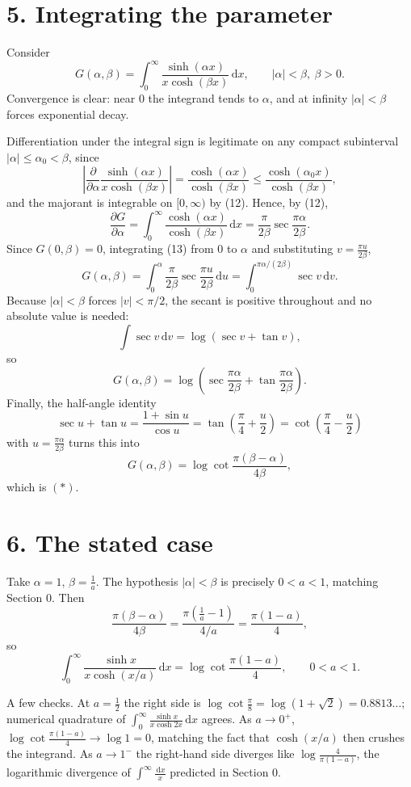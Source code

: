 \documentclass[12pt]{article}
\newcommand{\dd}{\,\mathrm{d}}
\begin{document}
\section*{5. Integrating the parameter}

Consider
\[
G(\alpha,\beta)=\int_0^\infty\frac{\sinh(\alpha x)}{x\cosh(\beta x)}\dd x,
\qquad |\alpha|<\beta,\ \beta>0 .
\]
Convergence is clear: near \(0\) the integrand tends to \(\alpha\), and at
infinity \(|\alpha|<\beta\) forces exponential decay.

Differentiation under the integral sign is legitimate on any compact
subinterval \(|\alpha|\le\alpha_0<\beta\), since
\[
\left|\frac{\partial}{\partial\alpha}
\frac{\sinh(\alpha x)}{x\cosh(\beta x)}\right|
=\frac{\cosh(\alpha x)}{\cosh(\beta x)}
\le\frac{\cosh(\alpha_0 x)}{\cosh(\beta x)},
\]
and the majorant is integrable on \([0,\infty)\) by (12). Hence, by (12),
\[
\frac{\partial G}{\partial\alpha}
=\int_0^\infty\frac{\cosh(\alpha x)}{\cosh(\beta x)}\dd x
=\frac{\pi}{2\beta}\sec\frac{\pi\alpha}{2\beta}.
\tag{13}
\]
Since \(G(0,\beta)=0\), integrating (13) from \(0\) to \(\alpha\) and
substituting \(v=\frac{\pi u}{2\beta}\),
\[
G(\alpha,\beta)
=\int_0^\alpha\frac{\pi}{2\beta}\sec\frac{\pi u}{2\beta}\dd u
=\int_0^{\pi\alpha/(2\beta)}\sec v\dd v .
\]
Because \(|\alpha|<\beta\) forces \(|v|<\pi/2\), the secant is positive
throughout and no absolute value is needed:
\[
\int\sec v\dd v=\log(\sec v+\tan v),
\]
so
\[
G(\alpha,\beta)
=\log\left(\sec\frac{\pi\alpha}{2\beta}+\tan\frac{\pi\alpha}{2\beta}\right).
\]
Finally, the half-angle identity
\[
\sec u+\tan u
=\frac{1+\sin u}{\cos u}
=\tan\left(\frac\pi4+\frac u2\right)
=\cot\left(\frac\pi4-\frac u2\right)
\]
with \(u=\frac{\pi\alpha}{2\beta}\) turns this into
\[
\boxed{\displaystyle
G(\alpha,\beta)=\log\cot\frac{\pi(\beta-\alpha)}{4\beta},}
\tag{14}
\]
which is \((\ast)\).

\section*{6. The stated case}

Take \(\alpha=1\), \(\beta=\frac1a\). The hypothesis \(|\alpha|<\beta\)
is precisely \(0<a<1\), matching Section 0. Then
\[
\frac{\pi(\beta-\alpha)}{4\beta}
=\frac{\pi\left(\frac1a-1\right)}{4/a}
=\frac{\pi(1-a)}{4},
\]
so
\[
\boxed{\displaystyle
\int_0^\infty\frac{\sinh x}{x\cosh(x/a)}\dd x
=\log\cot\frac{\pi(1-a)}4,\qquad 0<a<1.}
\]

A few checks. At \(a=\frac12\) the right side is
\(\log\cot\frac\pi8=\log(1+\sqrt2)=0.8813\ldots\); numerical quadrature
of \(\int_0^\infty\frac{\sinh x}{x\cosh 2x}\dd x\) agrees. As
\(a\to0^+\), \(\log\cot\frac{\pi(1-a)}{4}\to\log 1=0\), matching the fact
that \(\cosh(x/a)\) then crushes the integrand. As \(a\to1^-\) the
right-hand side diverges like \(\log\frac{4}{\pi(1-a)}\), the logarithmic
divergence of \(\int^\infty\frac{\dd x}{x}\) predicted in Section 0.
\end{document}
